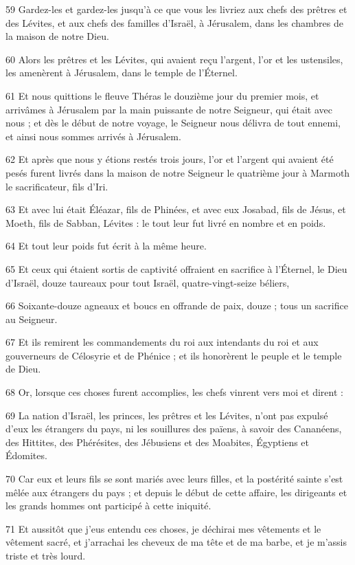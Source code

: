 \par 59 Gardez-les et gardez-les jusqu'à ce que vous les livriez aux chefs des prêtres et des Lévites, et aux chefs des familles d'Israël, à Jérusalem, dans les chambres de la maison de notre Dieu.
\par 60 Alors les prêtres et les Lévites, qui avaient reçu l'argent, l'or et les ustensiles, les amenèrent à Jérusalem, dans le temple de l'Éternel.
\par 61 Et nous quittions le fleuve Théras le douzième jour du premier mois, et arrivâmes à Jérusalem par la main puissante de notre Seigneur, qui était avec nous ; et dès le début de notre voyage, le Seigneur nous délivra de tout ennemi, et ainsi nous sommes arrivés à Jérusalem.
\par 62 Et après que nous y étions restés trois jours, l'or et l'argent qui avaient été pesés furent livrés dans la maison de notre Seigneur le quatrième jour à Marmoth le sacrificateur, fils d'Iri.
\par 63 Et avec lui était Éléazar, fils de Phinées, et avec eux Josabad, fils de Jésus, et Moeth, fils de Sabban, Lévites : le tout leur fut livré en nombre et en poids.
\par 64 Et tout leur poids fut écrit à la même heure.
\par 65 Et ceux qui étaient sortis de captivité offraient en sacrifice à l'Éternel, le Dieu d'Israël, douze taureaux pour tout Israël, quatre-vingt-seize béliers,
\par 66 Soixante-douze agneaux et boucs en offrande de paix, douze ; tous un sacrifice au Seigneur.
\par 67 Et ils remirent les commandements du roi aux intendants du roi et aux gouverneurs de Célosyrie et de Phénice ; et ils honorèrent le peuple et le temple de Dieu.
\par 68 Or, lorsque ces choses furent accomplies, les chefs vinrent vers moi et dirent :
\par 69 La nation d'Israël, les princes, les prêtres et les Lévites, n'ont pas expulsé d'eux les étrangers du pays, ni les souillures des païens, à savoir des Cananéens, des Hittites, des Phérésites, des Jébusiens et des Moabites, Égyptiens et Édomites.
\par 70 Car eux et leurs fils se sont mariés avec leurs filles, et la postérité sainte s'est mêlée aux étrangers du pays ; et depuis le début de cette affaire, les dirigeants et les grands hommes ont participé à cette iniquité.
\par 71 Et aussitôt que j'eus entendu ces choses, je déchirai mes vêtements et le vêtement sacré, et j'arrachai les cheveux de ma tête et de ma barbe, et je m'assis triste et très lourd.
